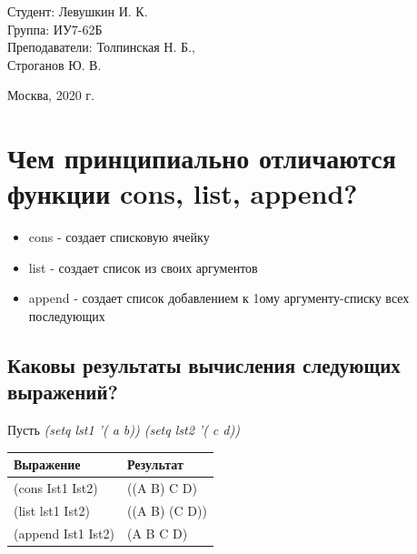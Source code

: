 \documentclass[a4paper,12pt]{article}
\begin{document}
	\vspace*{15mm} 	
	
	\large
	\begin{flushright}
		Студент: Левушкин И. К. \\
		Группа: ИУ7-62Б \\
		Преподаватели: Толпинская Н. Б., \\ Строганов Ю. В. \\
	\end{flushright}
	
	\vspace*{30mm}
	\begin{center}
		Москва, 2020 г.  
	\end{center}
	\thispagestyle{empty}
	
	
	\newpage
	
	\section{Чем принципиально отличаются функции cons, list, append?}
	
	\begin{itemize}
		\item cons - создает списковую ячейку
		\item list - создает список из своих аргументов
		\item append - создает список добавлением к 1ому аргументу-списку всех последующих
	\end{itemize}

	\subsection{Каковы результаты вычисления следующих выражений?}
	
	Пусть \textit{(setq lst1 '( a b)) (setq lst2 '( c d))}
	
	\begin{table} [h!]
		\begin{center}
			\begin{tabular}{|l|l|}
				\hline
				{\bf  Выражение} &    {\bf Результат} \\
				\hline
				{(cons Ist1 Ist2)} & ((A B) C D)\\
				\hline
				{(list lst1 Ist2)} & ((A B) (C D))\\
				\hline
				{(append Ist1 Ist2)} & (A B C D)\\
				\hline
			\end{tabular}  
			\label{m1}
		\end{center}
	\end{table}
	
\end{document}
